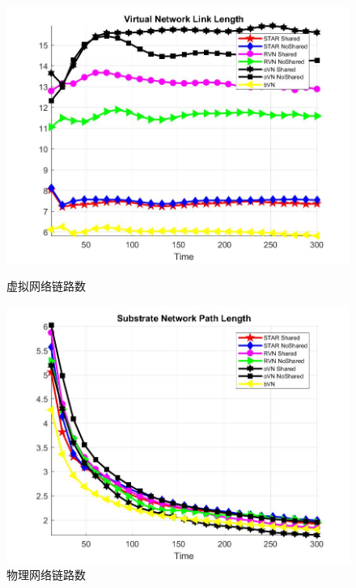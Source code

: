 \begin{figure}[htbp]
\centering
\begin{minipage}{0.4\textwidth}
\centering
\includegraphics[width=\textwidth]{figures/PathLengthAverageVirtualNetwork}
\caption{虚拟网络链路数}\label{fig:PathLengthAverageVirtualNetwork}
\end{minipage}
\begin{minipage}{0.4\textwidth}
\centering
\includegraphics[width=\textwidth]{figures/PathLengthAverageSubstrateNetwork}
\caption{物理网络链路数}\label{fig:PathLengthAverageSubstrateNetwork}
\end{minipage}
\begin{minipage}{0.4\textwidth}
\centering

\end{minipage}
\end{figure}
